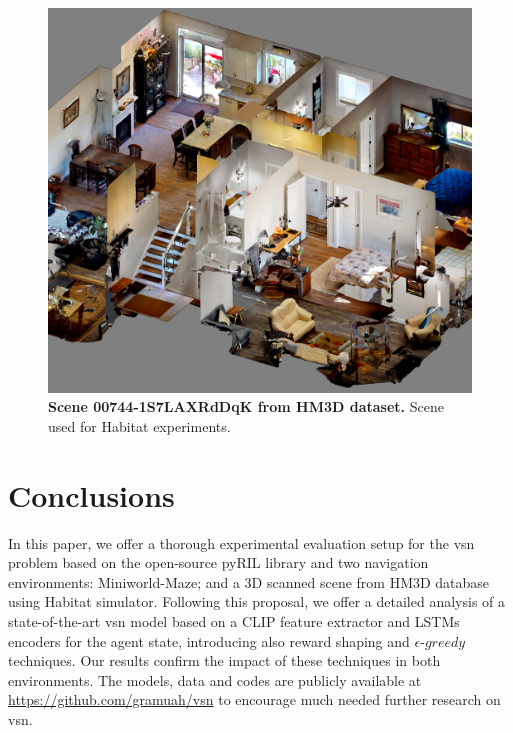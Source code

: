 \begin{figure}
    \centering
    \includegraphics[width=0.6\linewidth]{figures/understanding_vsn/dollhouse}
    \caption{\textbf{Scene 00744-1S7LAXRdDqK from HM3D dataset.} Scene used for Habitat experiments.}
    \label{fig:dollhouse}
\end{figure}

\section{Conclusions}
\label{sec:conclusions}

In this paper, we offer a thorough experimental evaluation setup for the \acrshort{vsn} problem based on the open-source pyRIL library and two navigation environments: Miniworld-Maze; and a 3D scanned scene from HM3D database using Habitat simulator.
Following this proposal, we offer a detailed analysis of a state-of-the-art \acrshort{vsn} model based on a CLIP feature extractor and LSTMs encoders for the agent state, introducing also reward shaping and $\epsilon\text{-}greedy$ techniques.
Our results confirm the impact of these techniques in both environments.
The models, data and codes are publicly available at \url{https://github.com/gramuah/vsn} to encourage much needed further research on \acrshort{vsn}\@.

